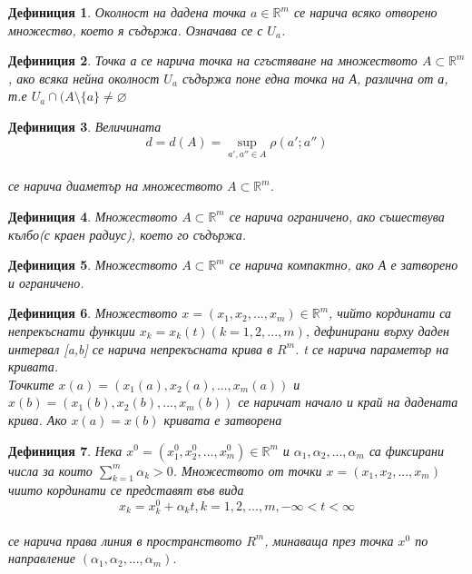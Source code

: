 \documentclass[a4paper,fleqn,12pt]{article}
\newtheorem{definition}{Дефиниция}[subsection]
\theoremstyle{definition}
\begin{document}
\begin{definition}
Околност на дадена точка $a \in \mathbb{R}^m $ се нарича всяко отворено множество, което я съдържа. Означава се с $U_a$.
\end{definition}

\begin{definition}
Точка а се нарича точка на сгъстяване на множеството $A \subset \mathbb{R}^m $, ако всяка нейна околност $U_a$ съдържа поне една точка на А, различна от а, т.е $U_a \cap (A\setminus \{ a \} \neq \varnothing $
\end{definition}

\begin{definition}
Величината \\
$$d = d(A) = \sup_{a',a'' \in A} \rho(a';a'')$$\\
се нарича диаметър на множеството  $A \subset \mathbb{R}^m $.
\end{definition}

\begin{definition}
Множеството  $A \subset \mathbb{R}^m $ се нарича ограничено, ако съшествува кълбо(с краен радиус), което го съдържа.
\end{definition}

\begin{definition}
Множеството  $A \subset \mathbb{R}^m $ се нарича компактно, ако А е затворено и ограничено.
\end{definition}

\begin{definition}
Множеството   $x = (x_1, x_2, ... , x_m) \in \mathbb{R}^m $, чийто кординати са непрекъснати функции $x_k = x_k(t) (k = 1, 2, ..., m)$, дефинирани върху даден интервал [a,b] се нарича непрекъсната крива в $R^m$. t се нарича параметър на кривата.\\
Точките $x(a) = (x_1(a), x_2(a), ... , x_m(a))$ и $x(b) = (x_1(b), x_2(b), ... , x_m(b))$ се наричат начало и край на дадената крива. Ако $x(a) = x(b)$ кривата е затворена
\end{definition}

\begin{definition}
Нека $x^0 = (x_1^0, x_2^0, ... , x_m^0) \in \mathbb{R}^m$ и $\alpha_1, \alpha_2, ... , \alpha_m$ са фиксирани числа за които $\sum_{k=1}^{m}\alpha_k > 0$. Множеството от точки $x = (x_1, x_2, ... , x_m)$ чиито кординати се представят във вида \\
$$x_k = x_k^0 + \alpha_kt, k = 1, 2, ..., m , -\infty < t <\infty $$\\
се нарича права линия в пространството $R^m$, минаваща през точка $x^0$ по направление $(\alpha_1, \alpha_2, ... , \alpha_m).$
\end{definition}
\end{document}
